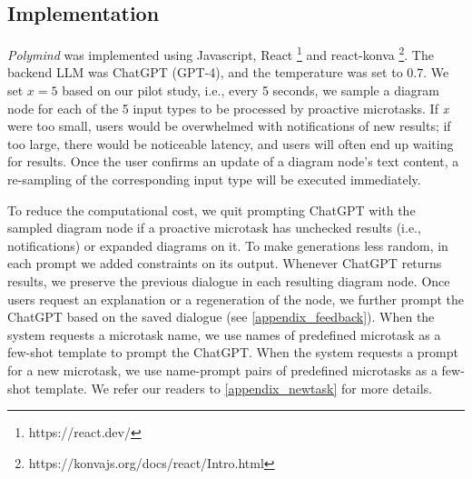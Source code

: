 \subsection{Implementation}
\textit{Polymind} was implemented using Javascript, React \footnote{https://react.dev/} and react-konva \footnote{https://konvajs.org/docs/react/Intro.html}. The backend LLM was ChatGPT (GPT-4), and the temperature was set to $0.7$.
We set $x=5$ based on our pilot study, i.e., every 5 seconds, we sample a diagram node for each of the 5 input types to be processed by proactive microtasks. If \textit{x} were too small, users would be overwhelmed with notifications of new results; if too large, there would be noticeable latency, and users will often end up waiting for results. Once the user confirms an update of a diagram node's text content, a re-sampling of the corresponding input type will be executed immediately.

To reduce the computational cost, we quit prompting ChatGPT with the sampled diagram node if a proactive microtask has unchecked results (i.e., notifications) or expanded diagrams on it.
To make generations less random, in each prompt we added constraints on its output.
Whenever ChatGPT returns results, we preserve the previous dialogue in each resulting diagram node. Once users request an explanation or a regeneration of the node, we further prompt the ChatGPT based on the saved dialogue (see \ref{appendix_feedback}). When the system requests a microtask name, we use names of predefined microtask as a few-shot template to prompt the ChatGPT. When the system requests a prompt for a new microtask, we use name-prompt pairs of predefined microtasks as a few-shot template. We refer our readers to \ref{appendix_newtask} for more details.